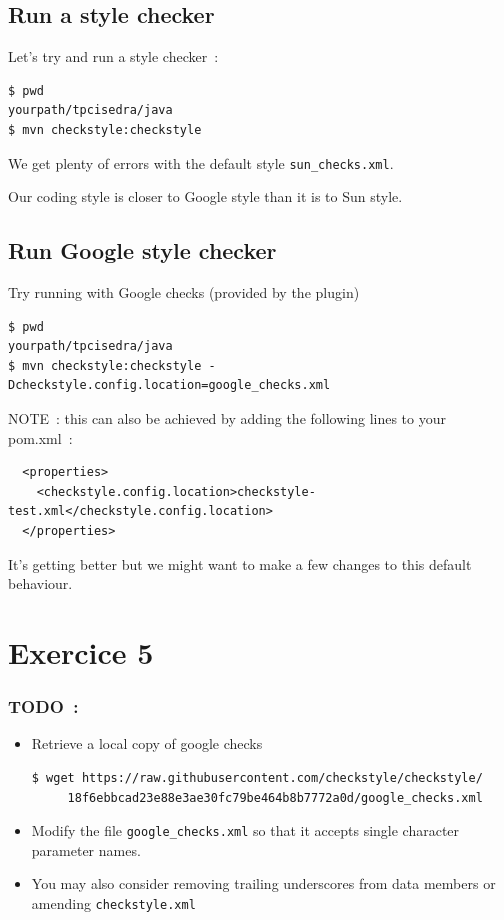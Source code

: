 \documentclass{article}
\begin{document}
\subsection{Run a style checker}

Let's try and run a style checker~:
\begin{lstlisting}
$ pwd
yourpath/tpcisedra/java
$ mvn checkstyle:checkstyle
\end{lstlisting}
We get plenty of errors with the default style \verb?sun_checks.xml?.

Our coding style is closer to Google style than it is to Sun style.

\subsection{Run Google style checker}

Try running with Google checks (provided by the plugin)
\begin{lstlisting}
$ pwd
yourpath/tpcisedra/java
$ mvn checkstyle:checkstyle -Dcheckstyle.config.location=google_checks.xml
\end{lstlisting}
NOTE~: this can also be achieved by adding the following lines to your pom.xml~:
\begin{lstlisting}
  <properties>
    <checkstyle.config.location>checkstyle-test.xml</checkstyle.config.location>
  </properties>
\end{lstlisting}

It's getting better but we might want to make a few changes to this default behaviour.

\section{Exercice 5}

\subsubsection{TODO~:}

\begin{itemize}
\item Retrieve a local copy of google checks
\begin{lstlisting}
$ wget https://raw.githubusercontent.com/checkstyle/checkstyle/
     18f6ebbcad23e88e3ae30fc79be464b8b7772a0d/google_checks.xml
\end{lstlisting}
\item  Modify the file \texttt{google\_checks.xml} so that it accepts single character parameter names.
\item You may also consider removing trailing underscores from data members or amending \texttt{checkstyle.xml}
\end{itemize}
\end{document}
